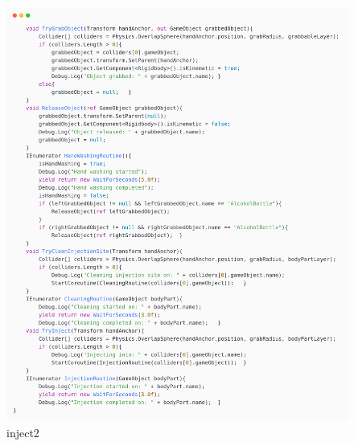 \begin{figure}[h] 
	\centering
	\includegraphics[width=1\textwidth, height=0.7\textheight]{Images/inject2.png}
	\caption{inject2}
	\label{fig:Hands Washing}
\end{figure}
\newpage
